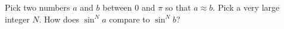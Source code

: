 \documentclass{ximera}
\begin{document}
\begin{problem}
  Pick two numbers $a$ and $b$ between $0$ and $\pi$ so that
  $a \approx b$.  Pick a very large integer $N$.  How does $\sin^N a$
  compare to $\sin^N b$?
  \begin{multipleChoice}
  \end{multipleChoice}
\end{problem}
\end{document}

